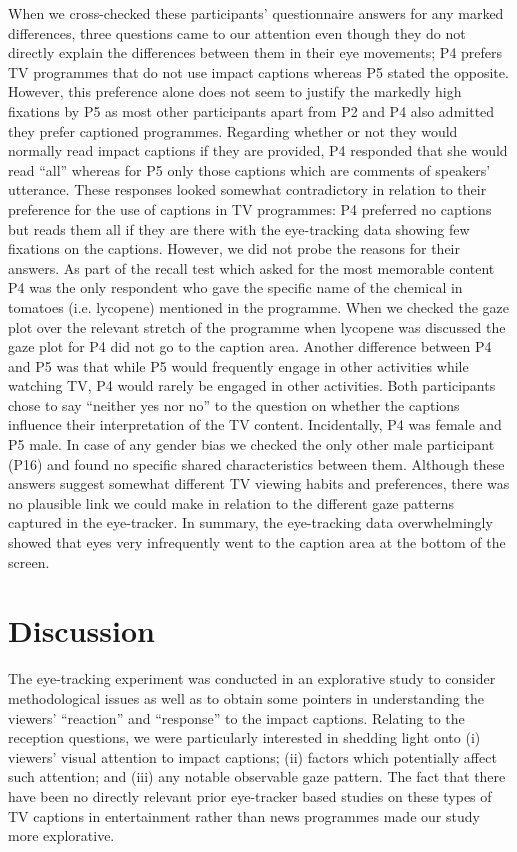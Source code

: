 \documentclass[output=paper]{langsci/langscibook}
\begin{document}
When we cross-checked these participants' questionnaire answers for any marked differences, three questions came to our attention even though they do not directly explain the differences between them in their eye movements; P4 prefers TV programmes that do not use impact captions whereas P5 stated the opposite. However, this preference alone does not seem to justify the markedly high fixations by P5 as most other participants apart from P2 and P4 also admitted they prefer captioned programmes. Regarding whether or not they would normally read impact captions if they are provided, P4 responded that she would read ``all'' whereas for P5 only those captions which are comments of speakers' utterance. These responses looked somewhat contradictory in relation to their preference for the use of captions in TV programmes: P4 preferred no captions but reads them all if they are there with the eye-tracking data showing few fixations on the captions. However, we did not probe the reasons for their answers. As part of the recall test which asked for the most memorable content P4 was the only respondent who gave the specific name of the chemical in tomatoes (i.e. lycopene) mentioned in the programme. When we checked the gaze plot over the relevant stretch of the programme when lycopene was discussed the gaze plot for P4 did not go to the caption area. Another difference between P4 and P5 was that while P5 would frequently engage in other activities while watching TV, P4 would rarely be engaged in other activities. Both participants chose to say ``neither yes nor no'' to the question on whether the captions influence their interpretation of the TV content. Incidentally, P4 was female and P5 male. In case of any gender bias we checked the only other male participant (P16) and found no specific shared characteristics between them. Although these answers suggest somewhat different TV viewing habits and preferences, there was no plausible link we could make in relation to the different gaze patterns captured in the eye-tracker.  In summary, the eye-tracking data overwhelmingly showed that eyes very infrequently went to the caption area at the bottom of the screen. 


\section{Discussion}

The eye-tracking experiment was conducted in an explorative study to consider methodological issues as well as to obtain some pointers in understanding the viewers' ``reaction'' and ``response'' to the impact captions. Relating to the reception questions, we were particularly interested in shedding light onto (i) viewers' visual attention to impact captions; (ii) factors which potentially affect such attention; and (iii) any notable observable gaze pattern. The fact that there have been no directly relevant prior eye-tracker based studies on these types of TV captions in entertainment rather than news programmes made our study more explorative. 
\end{document}
